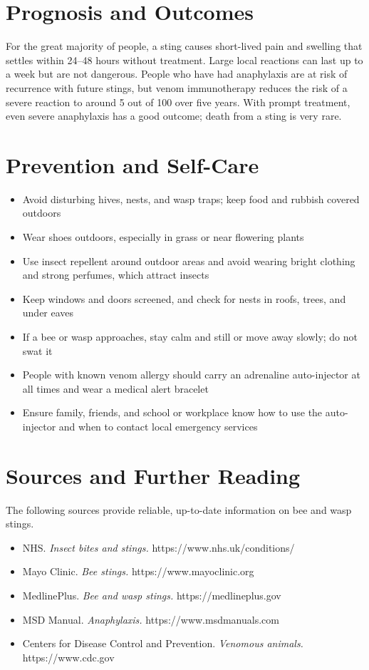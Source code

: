 \section*{Prognosis and Outcomes}
For the great majority of people, a sting causes short-lived pain and swelling that settles within 24--48 hours without treatment. Large local reactions can last up to a week but are not dangerous. People who have had anaphylaxis are at risk of recurrence with future stings, but venom immunotherapy reduces the risk of a severe reaction to around 5 out of 100 over five years. With prompt treatment, even severe anaphylaxis has a good outcome; death from a sting is very rare.

\section*{Prevention and Self-Care}
\begin{itemize}
    \item Avoid disturbing hives, nests, and wasp traps; keep food and rubbish covered outdoors
    \item Wear shoes outdoors, especially in grass or near flowering plants
    \item Use insect repellent around outdoor areas and avoid wearing bright clothing and strong perfumes, which attract insects
    \item Keep windows and doors screened, and check for nests in roofs, trees, and under eaves
    \item If a bee or wasp approaches, stay calm and still or move away slowly; do not swat it
    \item People with known venom allergy should carry an adrenaline auto-injector at all times and wear a medical alert bracelet
    \item Ensure family, friends, and school or workplace know how to use the auto-injector and when to contact local emergency services
\end{itemize}

\section*{Sources and Further Reading}
The following sources provide reliable, up-to-date information on bee and wasp stings.
\begin{itemize}
    \item NHS. \textit{Insect bites and stings.} https://www.nhs.uk/conditions/
    \item Mayo Clinic. \textit{Bee stings.} https://www.mayoclinic.org
    \item MedlinePlus. \textit{Bee and wasp stings.} https://medlineplus.gov
    \item MSD Manual. \textit{Anaphylaxis.} https://www.msdmanuals.com
    \item Centers for Disease Control and Prevention. \textit{Venomous animals.} https://www.cdc.gov
\end{itemize}
